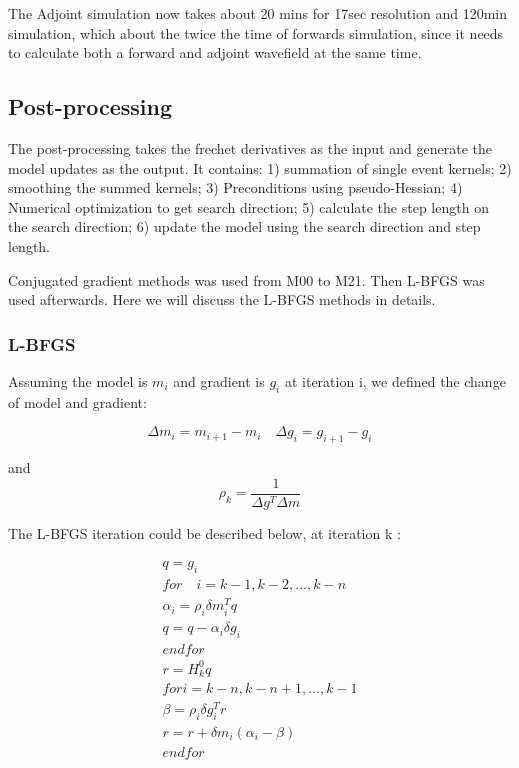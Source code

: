 \documentclass[extra,mreferee]{gji}
\begin{document}
The Adjoint simulation now takes about 20 mins for 17sec resolution and 120min simulation, which about the twice the time of forwards simulation, since it needs to calculate both a forward and adjoint wavefield at the same time.

\subsection{Post-processing}
The post-processing takes the frechet derivatives as the input and generate the model updates as the output. It contains: 1) summation of single event kernels; 2) smoothing the summed kernels; 3) Preconditions using pseudo-Hessian; 4) Numerical optimization to get search direction; 5) calculate the step length on the search direction; 6) update the model using the search direction and step length.

Conjugated gradient methods was used from M00 to M21. Then L-BFGS was used afterwards. Here we will discuss the L-BFGS methods in details.

\subsubsection{L-BFGS}

Assuming the model is $m_i$ and gradient is $g_i$ at iteration i, we
defined the change of model and gradient:

\begin{equation*}
    \Delta m_i = m_{i+1} - m_i \quad
    \Delta g_i = g_{i+1} - g_i
\end{equation*}

and
\begin{equation*}
     \rho_k = \frac{1}{\Delta g^{T} \Delta m}
\end{equation*}

The L-BFGS iteration could be described below, at iteration k \citep{wright1999numerical}:

\begin{align*}
q = g_i \\
for \quad i = k -1, k-2, ..., k-n \\
    \alpha_i = \rho_i \delta m_{i}^{T} q \\
    q = q - \alpha_i \delta g_i \\
end for\\
r = H_k^{0}q \\
for i = k-n, k-n+1, ..., k-1 \\
    \beta = \rho_i \delta g_i^{T}r \\
    r = r + \delta m_i(\alpha_i - \beta) \\
end for \\
\end{align*}
\end{document}
